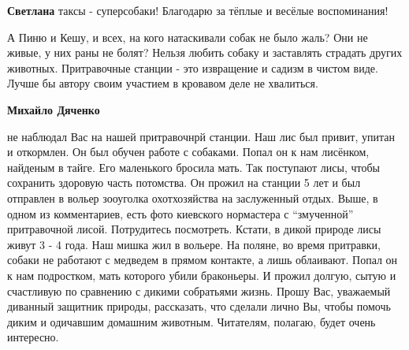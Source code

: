 \begin{itemize}
\begin{itemize} %
\textbf{Светлана} таксы - суперсобаки! Благодарю за тёплые и весёлые воспоминания!
\end{itemize} %


А Пиню и Кешу, и всех, на кого натаскивали собак не было жаль? Они не живые, у
них раны не болят? Нельзя любить собаку и заставлять страдать других животных.
Притравочные станции - это извращение и садизм в чистом виде. Лучше бы автору
своим участием в кровавом деле не хвалиться.

\begin{itemize} %
\textbf{Михайло Дяченко} 

не наблюдал Вас на нашей притравочнрй станции. Наш лис был привит, упитан и
откормлен. Он был обучен работе с собаками. Попал он к нам лисёнком, найденым в
тайге. Его маленького бросила мать. Так поступают лисы, чтобы сохранить
здоровую часть потомства. Он прожил на станции 5 лет и был отправлен в вольер
зооуголка охотхозяйства на заслуженный отдых. Выше, в одном из комментариев,
есть фото киевского нормастера с \enquote{змученной} притравочной лисой. Потрудитесь
посмотреть. Кстати, в дикой природе лисы живут 3 - 4 года. Наш мишка жил в
вольере. На поляне, во время притравки, собаки не работают с медведем в прямом
контакте, а лишь облаивают. Попал он к нам подростком, мать которого убили
браконьеры. И прожил долгую, сытую и счастливую по сравнению с дикими
собратьями жизнь. Прошу Вас, уважаемый диванный защитник природы, рассказать,
что сделали лично Вы, чтобы помочь диким и одичавшим домашним животным.
Читателям, полагаю, будет очень интересно.

\end{itemize} %

\end{itemize} %
